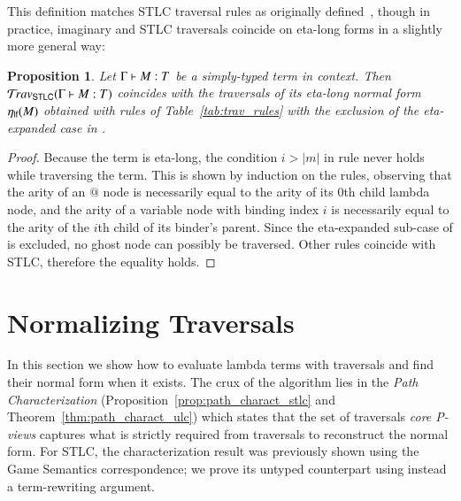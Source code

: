 \documentclass{elsarticle}
\theoremstyle{plain}
\newtheorem{proposition}[theorem]{Proposition}
\theoremstyle{definition}
\theoremstyle{remark}
\newcommand{\travstlc}{{\travset_{\sf STLC}}}
\begin{document}
This definition matches STLC traversal rules as originally defined~\cite{BlumPhd}, though in practice, imaginary and STLC traversals coincide on eta-long forms in a slightly more general way:
\begin{proposition}
\label{prop:ulc_and_stlc_trav_coincide}
Let $\Gamma \vdash M : T$ be a simply-typed term in context.
 Then $\travstlc(\Gamma \entail M : T)$ coincides with the
 traversals of its eta-long normal form
 $\eta_{\sf lf}(M)$ obtained with rules of Table~\ref{tab:trav_rules} with the exclusion of the eta-expanded case in .
\end{proposition}
\begin{proof}
Because the term is eta-long, the condition $i>|m|$ in rule  never holds while traversing the term. This is shown by induction on the rules, observing that the arity of an $@$ node is necessarily equal to the arity of its $0$th child lambda node, and the arity of a variable node with binding index $i$ is necessarily equal to the arity of the $i$th child of its binder's parent.
Since the eta-expanded sub-case of  is excluded, no ghost node can possibly be traversed. Other rules coincide with STLC, therefore the equality holds.
\end{proof}


\section{Normalizing Traversals}
\label{sec:normalizing_trav}

In this section we show how to evaluate lambda terms with traversals and find their normal form when it exists. The crux of the algorithm lies in the \emph{Path Characterization} (Proposition~\ref{prop:path_charact_stlc} and Theorem~\ref{thm:path_charact_ulc}) which states that the set of traversals \emph{core P-views} captures what is strictly required from traversals to reconstruct the normal form.
For STLC, the characterization result was previously shown using the Game Semantics correspondence; we prove its untyped counterpart using instead a term-rewriting argument.
\end{document}
